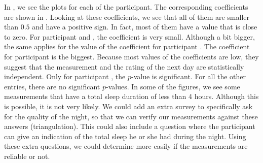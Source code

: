 \begin{figure}[H]
{		\label{fig: sleep user3}
	}
	\hspace{0.5cm}
	\label{fig: sleep duration analysis}
\end{figure}
\newpage
%
In , we see the plots for each of the participant.
The corresponding coefficients are shown in .
Looking at these coefficients, we see that all of them are smaller than $0.5$ and have a positive sign.
In fact, most of them have a value that is close to zero.
For participant  and , the coefficient is very small.
Although a bit bigger, the same applies for the value of the coefficient for participant .
The coefficient for participant  is the biggest.
Because most values of the coefficients are low, they suggest that the measurement and the rating of the next day are statistically independent.
Only for participant , the $p$-value is significant.
For all the other entries, there are no significant $p$-values.
In some of the figures, we see some measurements that have a total sleep duration of less than 4 hours.
Although this is possible, it is not very likely. 
We could add an extra survey to specifically ask for the quality of the night, so that we can verify our measurements against these answers (triangulation).
This could also include a question where the participant can give an indication of the total sleep he or she had during the night. 
Using these extra questions, we could determine more easily if the measurements are reliable or not.